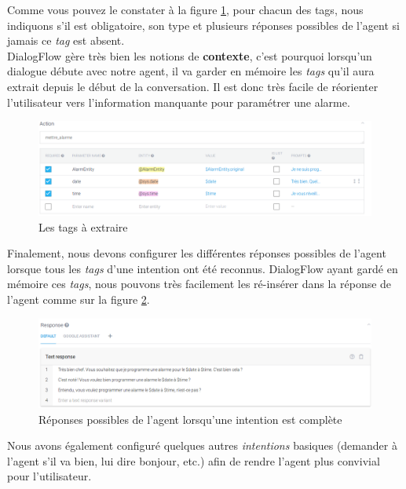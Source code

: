Comme vous pouvez le constater à la figure \ref{action}, pour chacun des tags, nous indiquons s'il est obligatoire, son type et plusieurs réponses possibles de l'agent si jamais ce \emph{tag} est absent.\\

DialogFlow gère
très bien les notions de \textbf{contexte}, c'est pourquoi lorsqu'un dialogue débute avec notre agent, il va garder en mémoire les \emph{tags} qu'il aura extrait depuis le
début de la conversation. Il est donc très facile de réorienter l'utilisateur vers l'information manquante pour paramétrer une alarme.

\begin{figure}[H]
    \centering
        \centering
        \includegraphics[width=\textwidth]{images/action.png}
        \caption{Les tags à extraire}
        \label{action}
\end{figure}

Finalement, nous devons configurer les différentes réponses possibles de l'agent lorsque tous les \emph{tags} d'une intention ont été reconnus. DialogFlow ayant gardé en mémoire
ces \emph{tags}, nous pouvons très facilement les ré-insérer dans la réponse de l'agent comme sur la figure \ref{answer}.

\begin{figure}[H]
    \centering
        \centering
        \includegraphics[width=1\textwidth]{images/answer.png}
        \caption{Réponses possibles de l'agent lorsqu'une intention est complète}
        \label{answer}
\end{figure}

Nous avons également configuré quelques autres \emph{intentions} basiques (demander à l'agent s'il va bien, lui dire bonjour, etc.) afin de rendre l'agent plus convivial
pour l'utilisateur.\\

